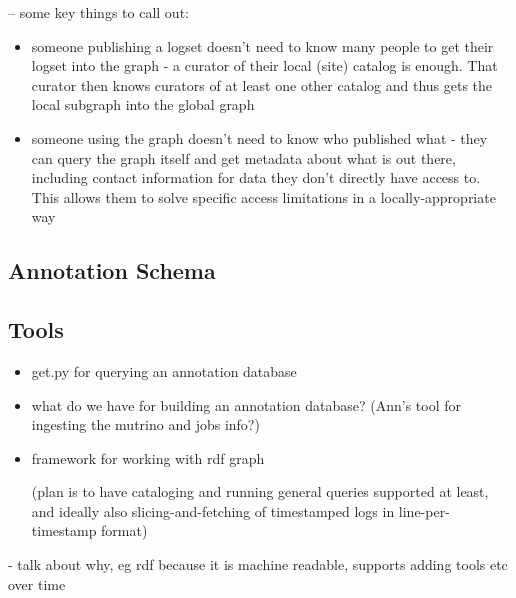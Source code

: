 -- some key things to call out:
\begin{itemize}
\item someone publishing a logset doesn't need to know many people to get their 
      logset into the graph - a curator of their local (site) catalog is enough. 
      That curator then knows curators of at least one other catalog and thus 
      gets the local 
      subgraph into the global graph
\item someone using the graph doesn't need to know who published what - they can
      query the graph itself and get metadata about what is out there, including contact 
      information for data they don't directly have access to. This allows them to 
      solve specific access limitations in a locally-appropriate way
\end{itemize}

 
\subsection{Annotation Schema}



\subsection{Tools}
\begin{itemize}
\item get.py for querying an annotation database
\item what do we have for building an annotation database? (Ann's tool for ingesting the mutrino and jobs info?)
\item framework for working with rdf graph

(plan is to have cataloging and running general queries supported at least, and ideally also slicing-and-fetching of timestamped logs in line-per-timestamp format)


\end{itemize}




- talk about why, eg rdf because it is machine readable, supports adding tools etc over time 

